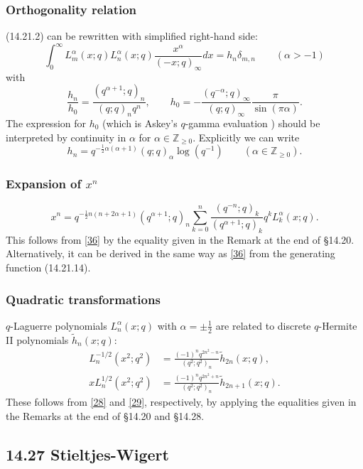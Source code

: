 \documentclass[twoside,11pt]{article}
\newcommand\ZZ{\mathbb{Z}}
\newcommand\al\alpha
\newcommand\de\delta
\newcommand\half{\frac12}
\newcommand\iy\infty
\newcommand\wt{\widetilde}
\newcommand\Znonneg{\ZZ_{\ge0}}
\newcommand\RHS{right-hand side}
\begin{document}
\subsubsection*{Orthogonality relation}
(14.21.2) can be rewritten with simplified \RHS:
\begin{equation}
\int_0^\iy L_m^{\al}(x;q) L_n^{\al}(x;q) \frac{x^\al}{(-x;q)_\iy} dx=h_n \de_{m,n}
\qquad(\al>-1)
\label{119}
\end{equation}
with
\begin{equation}
\frac{h_n}{h_0}=\frac{(q^{\al+1};q)_n}{(q;q)_n q^n},\qquad
h_0=- \frac{(q^{-\al};q)_\iy}{(q;q)_\iy} \frac\pi{\sin(\pi\al)} .
\label{120}
\end{equation}
The expression for $h_0$ (which is Askey's $q$-gamma evaluation
\cite[(4.2)]{K16})
should be interpreted by continuity in $\al$ for
$\al\in\Znonneg$.
Explicitly we can write
\begin{equation}
h_n=q^{-\half\al(\al+1)} (q;q)_\al \log(q^{-1})\qquad(\al\in\Znonneg).
\label{121}
\end{equation}
%
\subsubsection*{Expansion of $x^n$}
\begin{equation}
x^n=q^{-\half n(n+2\al+1)} (q^{\al+1};q)_n 
\sum_{k=0}^n\frac{(q^{-n};q)_k}{(q^{\al+1};q)_k} q^k L_k^\al(x;q).
\label{37}
\end{equation}
This follows from \eqref{36} by the equality given in the Remark at the end
of \S14.20. Alternatively, it can be derived in the same way as \eqref{36}
from the generating function (14.21.14).
%
\subsubsection*{Quadratic transformations}
$q$-Laguerre polynomials $L_n^\al(x;q)$ with $\al=\pm\half$ are
related to discrete $q$-Hermite II polynomials $\wt h_n(x;q)$:
\begin{align}
L_n^{-1/2}(x^2;q^2)&=
\frac{(-1)^n q^{2n^2-n}}{(q^2;q^2)_n} \wt h_{2n}(x;q),
\label{38}\\
xL_n^{1/2}(x^2;q^2)&=
\frac{(-1)^n q^{2n^2+n}}{(q^2;q^2)_n} \wt h_{2n+1}(x;q).
\label{39}
\end{align}
These follows from \eqref{28} and \eqref{29}, respectively, by applying
the equalities given in the Remarks at the end of \S14.20 and \S14.28.
%
\subsection*{14.27 Stieltjes-Wigert}
\label{sec14.27}
%
\end{document}
